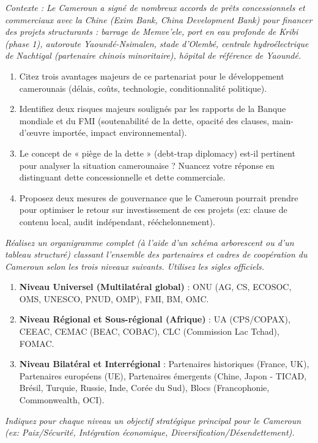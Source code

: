 \documentclass[11pt]{article}
\newcommand{\cle}[1]{{\popxbold\color{popdark}#1}}
\begin{document}
\begin{exercice}
\emph{Contexte : Le Cameroun a signé de nombreux accords de prêts concessionnels et commerciaux avec la Chine (Exim Bank, China Development Bank) pour financer des projets structurants : barrage de Memve'ele, port en eau profonde de Kribi (phase 1), autoroute Yaoundé-Nsimalen, stade d'Olembé, centrale hydroélectrique de Nachtigal (partenaire chinois minoritaire), hôpital de référence de Yaoundé.}
\begin{enumerate}
    \item Citez trois avantages majeurs de ce partenariat pour le \cle{développement} camerounais (délais, coûts, technologie, conditionnalité politique).
    \item Identifiez deux risques majeurs soulignés par les rapports de la Banque mondiale et du FMI (soutenabilité de la dette, opacité des clauses, main-d'œuvre importée, impact environnemental).
    \item Le concept de « \cle{piège de la dette} » (debt-trap diplomacy) est-il pertinent pour analyser la situation camerounaise ? Nuancez votre réponse en distinguant dette concessionnelle et dette commerciale.
    \item Proposez deux mesures de \cle{gouvernance} que le Cameroun pourrait prendre pour optimiser le retour sur investissement de ces projets (ex: clause de contenu local, audit indépendant, rééchelonnement).
\end{enumerate}
\end{exercice}

\begin{exercice}
\emph{Réalisez un organigramme complet (à l'aide d'un schéma arborescent ou d'un tableau structuré) classant l'ensemble des partenaires et cadres de coopération du Cameroun selon les trois niveaux suivants. Utilisez les sigles officiels.}
\begin{enumerate}
    \item \textbf{Niveau Universel (Multilatéral global)} : ONU (AG, CS, ECOSOC, OMS, UNESCO, PNUD, OMP), FMI, BM, OMC.
    \item \textbf{Niveau Régional et Sous-régional (Afrique)} : UA (CPS/COPAX), CEEAC, CEMAC (BEAC, COBAC), CLC (Commission Lac Tchad), FOMAC.
    \item \textbf{Niveau Bilatéral et Interrégional} : Partenaires historiques (France, UK), Partenaires européens (UE), Partenaires émergents (Chine, Japon - TICAD, Brésil, Turquie, Russie, Inde, Corée du Sud), Blocs (Francophonie, Commonwealth, OCI).
\end{enumerate}
\emph{Indiquez pour chaque niveau un objectif stratégique principal pour le Cameroun (ex: Paix/Sécurité, Intégration économique, Diversification/Désendettement).}
\end{exercice}
\end{document}
